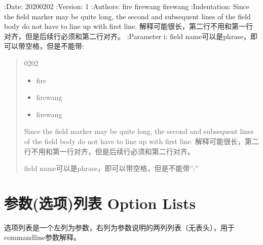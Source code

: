 \documentclass[a4paper,10pt,english]{sphinxmanual}
\begin{document}
\sphinxAtStartPar
{}

\begin{sphinxVerbatim}[commandchars=\\\{\}]
:Date: 2020\PYGZhy{}02\PYGZhy{}02
:Version: 1
:Authors: \PYGZhy{} fire
          \PYGZhy{} firewang
          \PYGZhy{} firewang
:Indentation: Since the field marker may be quite long, the second
   and subsequent lines of the field body do not have to line up with first line.
   解释可能很长，第二行不用和第一行对齐，但是后续行必须和第二行对齐。
:Parameter i: field name可以是phrase，即可以带空格，但是不能带\PYGZdq{}:\PYGZdq{}
\end{sphinxVerbatim}

\sphinxAtStartPar
{}
\begin{quote}\begin{description}
\sphinxhyphen{}02\sphinxhyphen{}02


\begin{itemize}
\item {} 
\sphinxAtStartPar
fire

\item {} 
\sphinxAtStartPar
firewang

\item {} 
\sphinxAtStartPar
firewang

\end{itemize}

\sphinxAtStartPar
Since the field marker may be quite long, the second
and subsequent lines of the field body do not have to line up with first line.
解释可能很长，第二行不用和第一行对齐，但是后续行必须和第二行对齐。

\sphinxAtStartPar
field name可以是phrase，即可以带空格，但是不能带”:”

\end{description}\end{quote}


\section{参数(选项)列表 Option Lists}
\label{\detokenize{reStructureText_syntax:option-lists}}
\sphinxAtStartPar
选项列表是一个左列为参数，右列为参数说明的两列列表（无表头），用于command\sphinxhyphen{}line参数解释。
\end{document}
